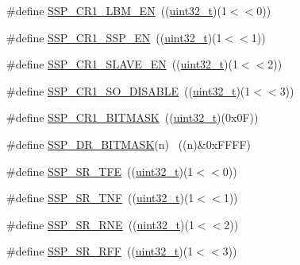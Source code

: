 \begin{DoxyCompactItemize}
\item 
\#define \hyperlink{group___s_s_p___private___macros_gac0e5bef37b94df5ad96bf270aa802dcd}{S\+S\+P\+\_\+\+C\+R1\+\_\+\+L\+B\+M\+\_\+\+EN}~((\hyperlink{_p_e___types_8h_a33594304e786b158f3fb30289278f5af}{uint32\+\_\+t})(1$<$$<$0))
\item 
\#define \hyperlink{group___s_s_p___private___macros_gaad500ed8cec6c1734a12a7f55ff6ec26}{S\+S\+P\+\_\+\+C\+R1\+\_\+\+S\+S\+P\+\_\+\+EN}~((\hyperlink{_p_e___types_8h_a33594304e786b158f3fb30289278f5af}{uint32\+\_\+t})(1$<$$<$1))
\item 
\#define \hyperlink{group___s_s_p___private___macros_ga483d570ffc25bc917c99b3e8ece75649}{S\+S\+P\+\_\+\+C\+R1\+\_\+\+S\+L\+A\+V\+E\+\_\+\+EN}~((\hyperlink{_p_e___types_8h_a33594304e786b158f3fb30289278f5af}{uint32\+\_\+t})(1$<$$<$2))
\item 
\#define \hyperlink{group___s_s_p___private___macros_gaf8cd75ca0bf07a236b992cca4769b4dc}{S\+S\+P\+\_\+\+C\+R1\+\_\+\+S\+O\+\_\+\+D\+I\+S\+A\+B\+LE}~((\hyperlink{_p_e___types_8h_a33594304e786b158f3fb30289278f5af}{uint32\+\_\+t})(1$<$$<$3))
\item 
\#define \hyperlink{group___s_s_p___private___macros_gad90a9c1c97a5c4e19e048e9686a4d8fa}{S\+S\+P\+\_\+\+C\+R1\+\_\+\+B\+I\+T\+M\+A\+SK}~((\hyperlink{_p_e___types_8h_a33594304e786b158f3fb30289278f5af}{uint32\+\_\+t})(0x0\+F))
\item 
\#define \hyperlink{group___s_s_p___private___macros_ga48ac9207e05fd0e569f64e290a07f53b}{S\+S\+P\+\_\+\+D\+R\+\_\+\+B\+I\+T\+M\+A\+SK}(n)  ~((n)\&0x\+F\+F\+F\+F)
\item 
\#define \hyperlink{group___s_s_p___private___macros_gaa56cadbf2604cf3d9706f3583be99f63}{S\+S\+P\+\_\+\+S\+R\+\_\+\+T\+FE}~((\hyperlink{_p_e___types_8h_a33594304e786b158f3fb30289278f5af}{uint32\+\_\+t})(1$<$$<$0))
\item 
\#define \hyperlink{group___s_s_p___private___macros_gabde0199183f2a747cd039c66d40cf534}{S\+S\+P\+\_\+\+S\+R\+\_\+\+T\+NF}~((\hyperlink{_p_e___types_8h_a33594304e786b158f3fb30289278f5af}{uint32\+\_\+t})(1$<$$<$1))
\item 
\#define \hyperlink{group___s_s_p___private___macros_ga67740be98d73a50bf341ca3e2c25da6e}{S\+S\+P\+\_\+\+S\+R\+\_\+\+R\+NE}~((\hyperlink{_p_e___types_8h_a33594304e786b158f3fb30289278f5af}{uint32\+\_\+t})(1$<$$<$2))
\item 
\#define \hyperlink{group___s_s_p___private___macros_gacb3442f8b9ec2dbb3be63f154cc58940}{S\+S\+P\+\_\+\+S\+R\+\_\+\+R\+FF}~((\hyperlink{_p_e___types_8h_a33594304e786b158f3fb30289278f5af}{uint32\+\_\+t})(1$<$$<$3))

\end{DoxyCompactItemize}
